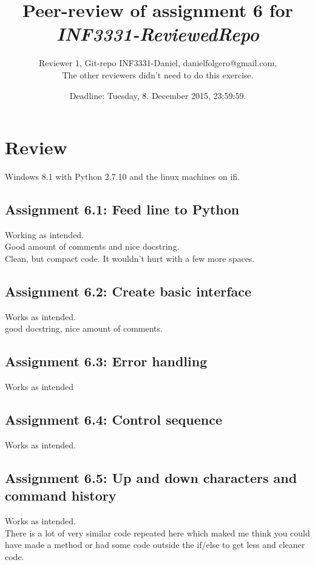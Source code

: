 \documentclass[a4paper]{article}
\title{Peer-review of assignment 6 for \textit{INF3331-ReviewedRepo}}
\author{Reviewer 1, Git-repo INF3331-Daniel, {danielfolgero@gmail.com},\\ The other reviewers didn't need to do this exercise.}
\date{Deadline: Tuesday, 8. December 2015, 23:59:59.}
\begin{document}
\maketitle

\section{Review}\label{sec:review}

Windows 8.1  with Python 2.7.10 and the linux machines on ifi.

\subsection*{Assignment 6.1: Feed line to Python}
Working as intended. \\
Good amount of comments and nice docstring.\\
Clean, but compact code. It wouldn't hurt with a few more spaces.

\subsection*{Assignment 6.2: Create basic interface} \label{sec:assignment6.2}
Works as intended.\\
good docstring, nice amount of comments.\\

\subsection*{Assignment 6.3: Error handling}
Works as intended

\subsection*{Assignment 6.4:  Control sequence}
Works as intended.

\subsection*{Assignment 6.5: Up and down characters and command history}
Works as intended.\\
There is a lot of very similar code repeated here which maked me think you could have made a method or had 
some code outside the if/else to get less and cleaner code.
\end{document}
